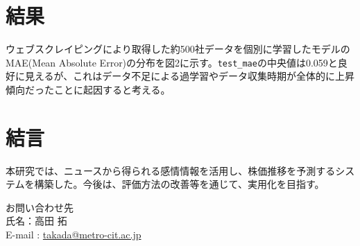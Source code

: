 \documentclass[a4paper, 10pt]{ltjsarticle}
\begin{document}
\section{結果}



ウェブスクレイピングにより取得した約500社データを個別に学習したモデルのMAE(Mean Absolute Error)の分布を図2に示す。\texttt{test\_mae}の中央値は0.059と良好に見えるが、これはデータ不足による過学習やデータ収集時期が全体的に上昇傾向だったことに起因すると考える。




\section{結言}

本研究では、ニュースから得られる感情情報を活用し、株価推移を予測するシステムを構築した。今後は、評価方法の改善等を通じて、実用化を目指す。



\noindent
{}

お問い合わせ先\\
氏名：高田 拓 \\
E-mail : \href{mailto:takada@metro-cit.ac.jp}{takada@metro-cit.ac.jp}
\end{document}
